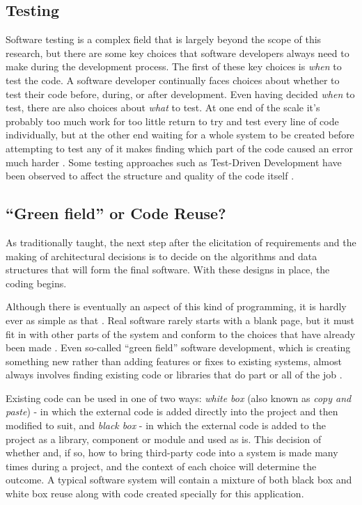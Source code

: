 \subsection{Testing}
\label{testing}
Software testing is a complex field \citep{Whittaker2000} that is largely beyond the scope of this research, but there are some key choices that software developers always need to make during the development process. The first of these key choices is \emph{when} to test the code. A software developer continually faces choices about whether to test their code before, during, or after development. Even having decided \emph{when} to test, there are also choices about \emph{what} to test. At one end of the scale it's probably too much work for too little return to try and test every line of code individually, but at the other end waiting for a whole system to be created before attempting to test any of it makes finding which part of the code caused an error much harder \citep{Singh2012}. Some testing approaches such as Test-Driven Development \citep{Beck2022} have been observed to affect the structure and quality of the code itself \citep{George2004}.

\subsection{\enquote{Green field} or Code Reuse?}
\label{A47}
As traditionally taught, the next step after the elicitation of requirements and the making of architectural decisions is to decide on the algorithms and data structures that will form the final software. With these designs in place, the coding begins.

Although there is eventually an aspect of this kind of programming, it is hardly ever as simple as that \citep{Cusumano1995}. Real software rarely starts with a blank page, but it must fit in with other parts of the system and conform to the choices that have already been made \citep{Spinellis2006}. Even so-called \enquote{green field} software development, which is creating something new rather than adding features or fixes to existing systems, almost always involves finding existing code or libraries that do part or all of the job \citep{Bjarnason2023} \citep{Sametinger1997}.

Existing code can be used in one of two ways: \emph{\gls{white box}} (also known as \emph{copy and paste}) - in which the external code is added directly into the project and then modified to suit, and \emph{\gls{black box}} - in which the external code is added to the project as a library, component or module and used as is. This decision of whether and, if so, how to bring third-party code into a system is made many times during a project, and the context of each choice will determine the outcome. A typical software system will contain a mixture of both black box and white box reuse along with code created specially for this application.

